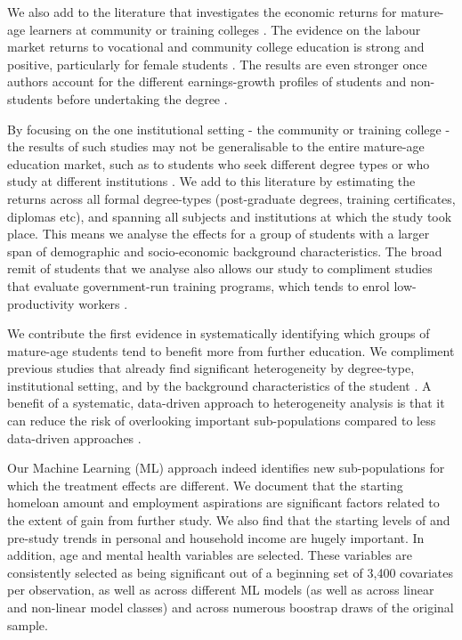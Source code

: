 \documentclass[12pt, a4paper]{article}
\begin{document}
We also add to the literature that investigates the economic returns for mature-age learners at community or training colleges \citep{jacobson2005,zeiden2015,polidano2016,xu2016,belfield2017,dynarski2016,dynarski2018,mountjoy2022}. The evidence on the labour market returns to vocational and community college education is strong and positive, particularly for female students \citep{belfield2017,zeiden2015,perales2017}. The results are even stronger once authors account for the different earnings-growth profiles of students and non-students before undertaking the degree \citep{dynarski2016,dynarski2018}.

By focusing on the one institutional setting - the community or training college - the results of such studies may not be generalisable to the entire mature-age education market, such as to students who seek different degree types or who study at different institutions \citep{belfield2017model,mountjoy2022}. We add to this literature by estimating the returns across all formal degree-types (post-graduate degrees, training certificates, diplomas etc), and spanning all subjects and institutions at which the study took place. This means we analyse the effects for a group of students with a larger span of demographic and socio-economic background characteristics. The broad remit of students that we analyse also allows our study to compliment studies that evaluate government-run training programs, which tends to enrol low-productivity workers \citep{ashenfelter1978,ashenfelter1985,bloom1990,leigh1990,raaum2002,jacobson2005,card2018,knaus2022}. 

We contribute the first evidence in systematically identifying which groups of mature-age students tend to benefit more from further education. We compliment previous studies that already find significant heterogeneity by degree-type, institutional setting, and by the background characteristics of the student \citep{blanden2012,zeiden2015,polidano2016,dorsett2016,xu2016,belfield2017,perales2017,bockerman2019}. A benefit of a systematic, data-driven approach to heterogeneity analysis is that it can reduce the risk of overlooking important sub-populations compared to less data-driven approaches \citep{athey2017,knaus2021}. 

Our Machine Learning (ML) approach indeed identifies new sub-populations for which the treatment effects are different. We document that the starting homeloan amount and employment aspirations are significant factors related to the extent of gain from further study. We also find that the starting levels of and pre-study trends in personal and household income are hugely important. In addition, age and mental health variables are selected. These variables are consistently selected as being significant out of a beginning set of 3,400 covariates per observation, as well as across different ML models (as well as across linear and non-linear model classes) and across numerous boostrap draws of the original sample.
\end{document}
